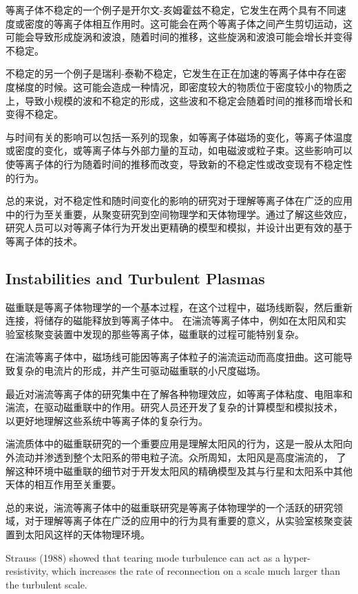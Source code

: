 \documentclass[12pt, a4paper, oneside]{article}
\begin{document}
\begin{spacing}{2.0}
等离子体不稳定的一个例子是开尔文-亥姆霍兹不稳定，它发生在两个具有不同速度或密度的等离子体相互作用时。这可能会在两个等离子体之间产生剪切运动，这可能会导致形成旋涡和波浪，随着时间的推移，这些旋涡和波浪可能会增长并变得不稳定。

不稳定的另一个例子是瑞利-泰勒不稳定，它发生在正在加速的等离子体中存在密度梯度的时候。这可能会造成一种情况，即密度较大的物质位于密度较小的物质之上，导致小规模的波和不稳定的形成，这些波和不稳定会随着时间的推移而增长和变得不稳定。

与时间有关的影响可以包括一系列的现象，如等离子体磁场的变化，等离子体温度或密度的变化，或等离子体与外部力量的互动，如电磁波或粒子束。这些影响可以使等离子体的行为随着时间的推移而改变，导致新的不稳定性或改变现有不稳定性的行为。

总的来说，对不稳定性和随时间变化的影响的研究对于理解等离子体在广泛的应用中的行为至关重要，从聚变研究到空间物理学和天体物理学。通过了解这些效应，研究人员可以对等离子体行为开发出更精确的模型和模拟，并设计出更有效的基于等离子体的技术。

\subsection{Instabilities and Turbulent Plasmas}
磁重联是等离子体物理学的一个基本过程，在这个过程中，磁场线断裂，然后重新连接，将储存的磁能释放到等离子体中。
在湍流等离子体中，例如在太阳风和实验室核聚变装置中发现的那些等离子体，磁重联的过程可能特别复杂。

在湍流等离子体中，磁场线可能因等离子体粒子的湍流运动而高度扭曲。这可能导致复杂的电流片的形成，并产生可驱动磁重联的小尺度磁场。

最近对湍流等离子体的研究集中在了解各种物理效应，如等离子体粘度、电阻率和湍流，在驱动磁重联中的作用。研究人员还开发了复杂的计算模型和模拟技术，
以更好地理解这些系统中等离子体的复杂行为。

湍流质体中的磁重联研究的一个重要应用是理解太阳风的行为，这是一股从太阳向外流动并渗透到整个太阳系的带电粒子流。众所周知，太阳风是高度湍流的，
了解这种环境中磁重联的细节对于开发太阳风的精确模型及其与行星和太阳系中其他天体的相互作用至关重要。

总的来说，湍流等离子体中的磁重联研究是等离子体物理学的一个活跃的研究领域，对于理解等离子体在广泛的应用中的行为具有重要的意义，从实验室核聚变装置到太阳风这样的天体物理环境。

Strauss (1988) showed that tearing mode turbulence
can act as a hyper-resistivity, which increases the rate of reconnection on a scale much larger than
the turbulent scale. 


\end{spacing}
\end{document}
